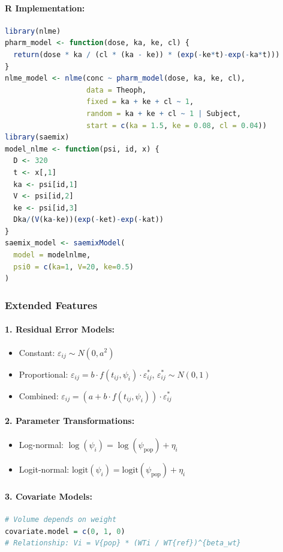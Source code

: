 \documentclass[11pt,a4paper]{article}
\begin{document}
\paragraph{R Implementation:}
\begin{lstlisting}[language=R]
library(nlme)
pharm_model <- function(dose, ka, ke, cl) {
  return(dose * ka / (cl * (ka - ke)) * (exp(-ke*t)-exp(-ka*t)))
}
nlme_model <- nlme(conc ~ pharm_model(dose, ka, ke, cl),
                   data = Theoph,
                   fixed = ka + ke + cl ~ 1,
                   random = ka + ke + cl ~ 1 | Subject,
                   start = c(ka = 1.5, ke = 0.08, cl = 0.04))
library(saemix)
model_nlme <- function(psi, id, x) {
  D <- 320
  t <- x[,1]
  ka <- psi[id,1]
  V <- psi[id,2]
  ke <- psi[id,3]
  Dka/(V(ka-ke))(exp(-ket)-exp(-kat))
}
saemix_model <- saemixModel(
  model = modelnlme,
  psi0 = c(ka=1, V=20, ke=0.5)
)
\end{lstlisting}

\subsubsection{Extended Features}
\paragraph{1. Residual Error Models:}
\begin{itemize}
  \item Constant: $\varepsilon_{ij} \sim N(0, a^2)$
  \item Proportional: $\varepsilon_{ij} = b \cdot f(t_{ij}, \psi_i) \cdot \varepsilon_{ij}^*$, $\varepsilon_{ij}^* \sim N(0, 1)$
  \item Combined: $\varepsilon_{ij} = (a + b \cdot f(t_{ij}, \psi_i)) \cdot \varepsilon_{ij}^*$
\end{itemize}
\paragraph{2. Parameter Transformations:}
\begin{itemize}
  \item Log-normal: $\log(\psi_i) = \log(\psi_{\text{pop}}) + \eta_i$
  \item Logit-normal: $\text{logit}(\psi_i) = \text{logit}(\psi_{\text{pop}}) + \eta_i$
\end{itemize}
\paragraph{3. Covariate Models:}
\begin{lstlisting}[language=R]
# Volume depends on weight
covariate.model = c(0, 1, 0)
# Relationship: Vi = V{pop} * (WTi / WT{ref})^{beta_wt}
\end{lstlisting}
\end{document}
